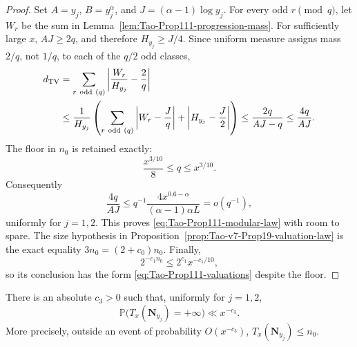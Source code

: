 \begin{proof}
Set \(A=y_j\), \(B=y_j^\alpha\), and
\(J=(\alpha-1)\log y_j\).  For every odd \(r\pmod q\), let \(W_r\) be
the sum in Lemma~\ref{lem:Tao-Prop111-progression-mass}.  For sufficiently
large \(x\), \(AJ\ge2q\), and therefore
\(H_{y_j}\ge J/4\).  Since uniform measure assigns mass \(2/q\), not
\(1/q\), to each of the \(q/2\) odd classes,
\begin{align}
 d_{\mathrm{TV}}
 &=\sum_{r\ {\rm odd}\ (q)}
   \left|\frac{W_r}{H_{y_j}}-\frac2q\right| \notag\\
 &\le \frac1{H_{y_j}}
 \left(
  \sum_{r\ {\rm odd}\ (q)}\left|W_r-\frac Jq\right|
  +\left|H_{y_j}-\frac J2\right|
 \right)
 \le\frac{2q}{AJ-q}\le\frac{4q}{AJ}.
\label{eq:Tao-Prop111-modular-L1-bound}
\end{align}
The floor in \(n_0\) is retained exactly:
\[
 \frac{x^{3/10}}8\le q\le x^{3/10}.
\]
Consequently
\[
 \frac{4q}{AJ}
 \le q^{-1}
 \frac{4x^{0.6-\alpha}}
      {(\alpha-1)\alpha L}
 =o(q^{-1}),
\]
uniformly for \(j=1,2\).  This proves
\eqref{eq:Tao-Prop111-modular-law} with room to spare.  The size hypothesis
in Proposition~\ref{prop:Tao-v7-Prop19-valuation-law} is the exact equality
\(3n_0=(2+c_0)n_0\).  Finally,
\[
 2^{-c_1n_0}\le2^{c_1}x^{-c_1/10},
\]
so its conclusion has the form \eqref{eq:Tao-Prop111-valuations} despite the
floor.
\end{proof}

\begin{proposition}
\label{prop:Tao-Prop111-finite-descent}
There is an absolute \(c_3>0\) such that, uniformly for \(j=1,2\),
\begin{equation}
\label{eq:Tao-Prop111-failure}
 \mathbb P\bigl(T_x(\mathbf N_{y_j})=+\infty\bigr)\ll x^{-c_3}.
\end{equation}
More precisely, outside an event of probability \(O(x^{-c_3})\),
\(T_x(\mathbf N_{y_j})\le n_0\).
\end{proposition}

